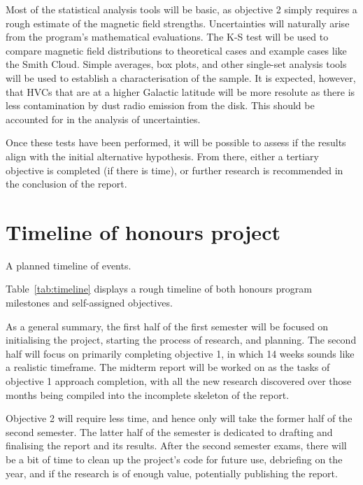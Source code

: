 Most of the statistical analysis tools will be basic, as objective 2 simply requires a rough estimate of the magnetic field strengths. Uncertainties will naturally arise from the program's mathematical evaluations. The K-S test will be used to compare magnetic field distributions to theoretical cases and example cases like the Smith Cloud. Simple averages, box plots, and other single-set analysis tools will be used to establish a characterisation of the sample. It is expected, however, that HVCs that are at a higher Galactic latitude will be more resolute as there is less contamination by dust radio emission from the disk. This should be accounted for in the analysis of uncertainties.

Once these tests have been performed, it will be possible to assess if the results align with the initial alternative hypothesis. From there, either a tertiary objective is completed (if there is time), or further research is recommended in the conclusion of the report.

\section{Timeline of honours project}
\label{sec:timeline}

\begin{table}[ht]
  \centering
  
  \caption{A planned timeline of events.}
  \label{tab:timeline}
\end{table}

Table~\ref{tab:timeline} displays a rough timeline of both honours program milestones and self-assigned objectives.

As a general summary, the first half of the first semester will be focused on initialising the project, starting the process of research, and planning. The second half will focus on primarily completing objective 1, in which 14 weeks sounds like a realistic timeframe. The midterm report will be worked on as the tasks of objective 1 approach completion, with all the new research discovered over those months being compiled into the incomplete skeleton of the report.

Objective 2 will require less time, and hence only will take the former half of the second semester. The latter half of the semester is dedicated to drafting and finalising the report and its results. After the second semester exams, there will be a bit of time to clean up the project's code for future use, debriefing on the year, and if the research is of enough value, potentially publishing the report.

